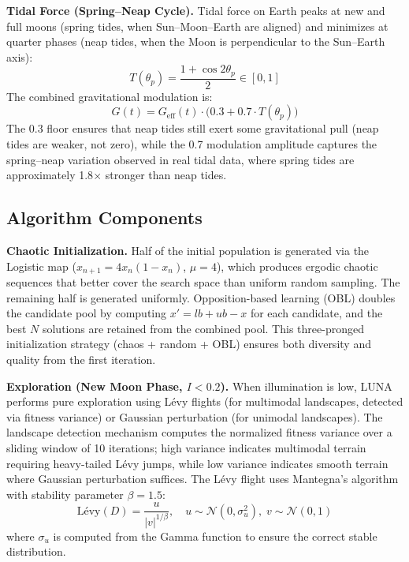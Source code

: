 \documentclass[11pt,a4paper]{article}
\begin{document}
\textbf{Tidal Force (Spring--Neap Cycle).} Tidal force on Earth peaks at new and full moons (spring tides, when Sun--Moon--Earth are aligned) and minimizes at quarter phases (neap tides, when the Moon is perpendicular to the Sun--Earth axis):
\begin{equation}\label{eq:tidal}
T(\theta_p) = \frac{1 + \cos 2\theta_p}{2} \in [0, 1]
\end{equation}
The combined gravitational modulation is:
\begin{equation}\label{eq:G_total}
G(t) = G_{\text{eff}}(t) \cdot \bigl(0.3 + 0.7 \cdot T(\theta_p)\bigr)
\end{equation}
The 0.3 floor ensures that neap tides still exert some gravitational pull (neap tides are weaker, not zero), while the 0.7 modulation amplitude captures the spring--neap variation observed in real tidal data, where spring tides are approximately 1.8$\times$ stronger than neap tides.

\subsection{Algorithm Components}

\textbf{Chaotic Initialization.} Half of the initial population is generated via the Logistic map ($x_{n+1} = 4x_n(1-x_n)$, $\mu=4$), which produces ergodic chaotic sequences that better cover the search space than uniform random sampling. The remaining half is generated uniformly. Opposition-based learning (OBL) doubles the candidate pool by computing $x' = lb + ub - x$ for each candidate, and the best $N$ solutions are retained from the combined pool. This three-pronged initialization strategy (chaos + random + OBL) ensures both diversity and quality from the first iteration.

\textbf{Exploration (New Moon Phase, $I < 0.2$).} When illumination is low, LUNA performs pure exploration using L\'evy flights (for multimodal landscapes, detected via fitness variance) or Gaussian perturbation (for unimodal landscapes). The landscape detection mechanism computes the normalized fitness variance over a sliding window of 10 iterations; high variance indicates multimodal terrain requiring heavy-tailed L\'evy jumps, while low variance indicates smooth terrain where Gaussian perturbation suffices. The L\'evy flight uses Mantegna's algorithm with stability parameter $\beta=1.5$:
\begin{equation}
\text{L\'evy}(D) = \frac{u}{|v|^{1/\beta}}, \quad u \sim \mathcal{N}(0, \sigma_u^2), \; v \sim \mathcal{N}(0, 1)
\end{equation}
where $\sigma_u$ is computed from the Gamma function to ensure the correct stable distribution.
\end{document}

